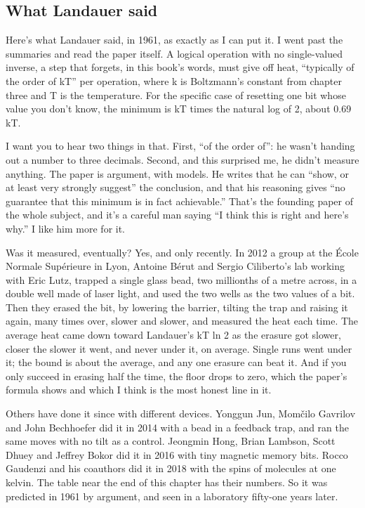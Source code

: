 \documentclass[11pt,twoside]{article}
\theoremstyle{thielethm}
\theoremstyle{thieledef}
\theoremstyle{thieledef}
\theoremstyle{thieledef}
\theoremstyle{thielethm}
\theoremstyle{thieleobs}
\theoremstyle{thielethm}
\begin{document}
\subsection{What Landauer said}

Here's what Landauer said, in 1961, as exactly as I can put it. I went past the summaries and read the paper itself. A logical operation with no single-valued inverse, a step that forgets, in this book's words, must give off heat, ``typically of the order of kT'' per operation, where k is Boltzmann's constant from chapter three and T is the temperature. For the specific case of resetting one bit whose value you don't know, the minimum is kT times the natural log of 2, about 0.69 kT.

I want you to hear two things in that. First, ``of the order of'': he wasn't handing out a number to three decimals. Second, and this surprised me, he didn't measure anything. The paper is argument, with models. He writes that he can ``show, or at least very strongly suggest'' the conclusion, and that his reasoning gives ``no guarantee that this minimum is in fact achievable.'' That's the founding paper of the whole subject, and it's a careful man saying ``I think this is right and here's why.'' I like him more for it.

Was it measured, eventually? Yes, and only recently. In 2012 a group at the École Normale Supérieure in Lyon, Antoine Bérut and Sergio Ciliberto's lab working with Eric Lutz, trapped a single glass bead, two millionths of a metre across, in a double well made of laser light, and used the two wells as the two values of a bit. Then they erased the bit, by lowering the barrier, tilting the trap and raising it again, many times over, slower and slower, and measured the heat each time. The average heat came down toward Landauer's kT ln 2 as the erasure got slower, closer the slower it went, and never under it, on average. Single runs went under it; the bound is about the average, and any one erasure can beat it. And if you only succeed in erasing half the time, the floor drops to zero, which the paper's formula shows and which I think is the most honest line in it.

Others have done it since with different devices. Yonggun Jun, Momčilo Gavrilov and John Bechhoefer did it in 2014 with a bead in a feedback trap, and ran the same moves with no tilt as a control. Jeongmin Hong, Brian Lambson, Scott Dhuey and Jeffrey Bokor did it in 2016 with tiny magnetic memory bits. Rocco Gaudenzi and his coauthors did it in 2018 with the spins of molecules at one kelvin. The table near the end of this chapter has their numbers. So it was predicted in 1961 by argument, and seen in a laboratory fifty-one years later.
\end{document}
